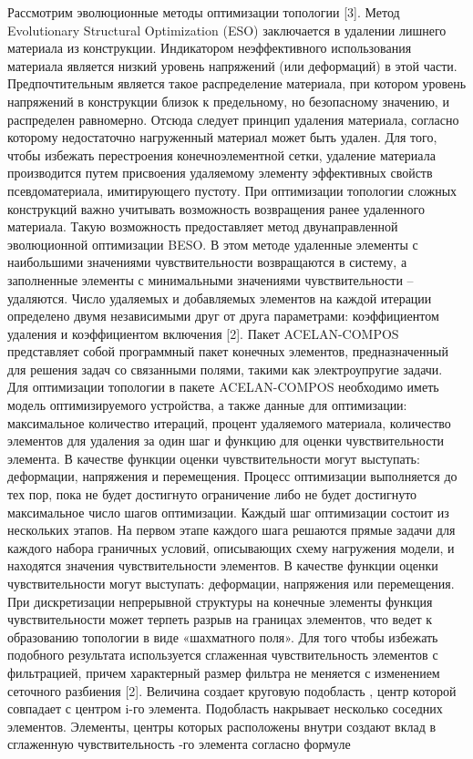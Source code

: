 Рассмотрим эволюционные методы оптимизации топологии [3]. Метод Evolutionary Structural Optimization (ESO) заключается в удалении лишнего материала из конструкции. Индикатором неэффективного использования материала является низкий уровень напряжений (или деформаций) в этой части. Предпочтительным является такое распределение материала, при котором уровень напряжений в конструкции близок к предельному, но безопасному значению, и распределен равномерно. Отсюда следует принцип удаления материала, согласно которому недостаточно нагруженный материал может быть удален. Для того, чтобы избежать перестроения конечноэлементной сетки, удаление материала производится путем присвоения удаляемому элементу эффективных свойств псевдоматериала, имитирующего пустоту. 
При оптимизации топологии сложных конструкций важно учитывать возможность возвращения ранее удаленного материала. Такую возможность предоставляет метод двунаправленной эволюционной оптимизации BESO. В этом методе удаленные элементы с наибольшими значениями чувствительности возвращаются в систему, а заполненные элементы с минимальными значениями чувствительности – удаляются. Число удаляемых и добавляемых элементов на каждой итерации определено двумя независимыми друг от друга параметрами: коэффициентом удаления   и коэффициентом включения  [2]. 
Пакет ACELAN-COMPOS представляет собой программный пакет конечных элементов, предназначенный для решения задач со связанными полями, такими как электроупругие задачи.
Для оптимизации топологии в пакете ACELAN-COMPOS необходимо иметь модель оптимизируемого устройства, а также данные для оптимизации: максимальное количество итераций, процент удаляемого материала, количество элементов для удаления за один шаг и функцию для оценки чувствительности элемента. В качестве функции оценки чувствительности могут выступать: деформации, напряжения и перемещения. Процесс оптимизации выполняется до тех пор, пока не будет достигнуто ограничение либо не будет достигнуто максимальное число шагов оптимизации. Каждый шаг оптимизации состоит из нескольких этапов.
На первом этапе каждого шага решаются прямые задачи для каждого набора граничных условий, описывающих схему нагружения модели, и находятся значения чувствительности элементов. В качестве функции оценки чувствительности могут выступать: деформации, напряжения или перемещения. 
При дискретизации непрерывной структуры на конечные элементы функция чувствительности может терпеть разрыв на границах элементов, что ведет к образованию топологии в виде «шахматного поля».
Для того чтобы избежать подобного результата используется сглаженная чувствительность элементов с фильтрацией, причем характерный размер фильтра   не меняется с изменением сеточного разбиения [2]. Величина   создает круговую подобласть  , центр которой совпадает с центром i-го элемента. Подобласть   накрывает несколько соседних элементов. Элементы, центры которых расположены внутри   создают вклад в сглаженную чувствительность  -го элемента согласно формуле

